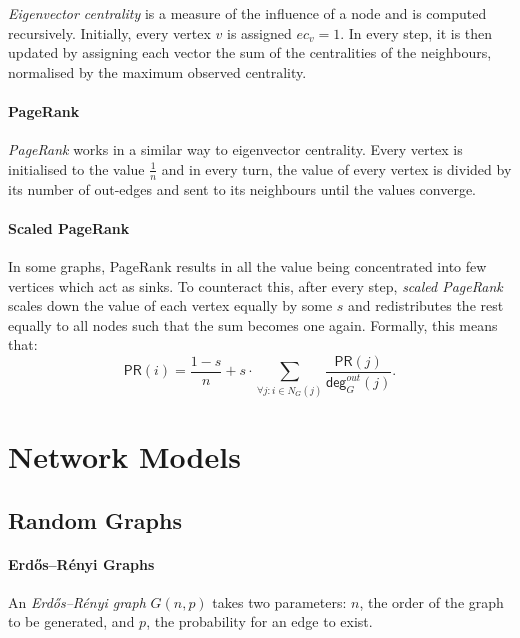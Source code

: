 \documentclass[english]{panikzettel}
\renewcommand\deg{\textsf{deg}}
\begin{document}
\textit{Eigenvector centrality} is a measure of the influence of a node and is computed recursively.
Initially, every vertex $v$ is assigned $ec_v = 1$.
In every step, it is then updated by assigning each vector the sum of the centralities of the neighbours, normalised by the maximum observed centrality.

\paragraph{PageRank}

\textit{PageRank} works in a similar way to eigenvector centrality.
Every vertex is initialised to the value $\frac{1}{n}$ and in every turn, the value of every vertex is divided by its number of out-edges and sent to its neighbours until the values converge.



\paragraph{Scaled PageRank}

In some graphs, PageRank results in all the value being concentrated into few vertices which act as sinks.
To counteract this, after every step, \textit{scaled PageRank} scales down the value of each vertex equally by some $s$ and redistributes the rest equally to all nodes such that the sum becomes one again.
Formally, this means that:
\[
    \textsf{PR}(i) = \frac{1-s}{n}+s \cdot \sum_{\forall j: i \in N_G(j)}\frac{\textsf{PR}(j)}{\deg^{out}_G(j)}.
\]



\section{Network Models}

\subsection{Random Graphs}

\paragraph{Erdős–Rényi Graphs}

An \textit{Erdős–Rényi graph} $G(n,p)$ takes two parameters: $n$, the order of the graph to be generated, and $p$, the probability for an edge to exist.
\end{document}
